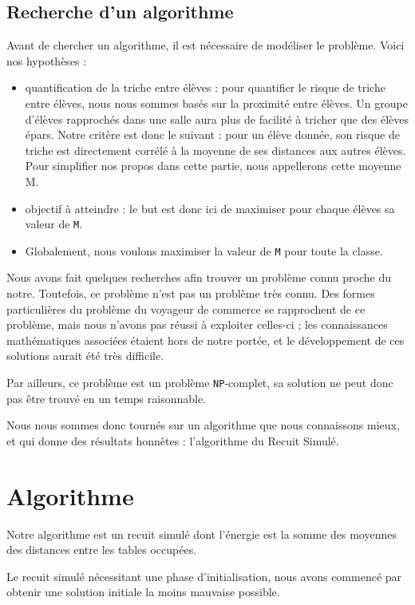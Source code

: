 \documentclass[11pt,a4paper, openany]{book}
\begin{document}
\section*{Recherche d'un algorithme}

Avant de chercher un algorithme, il est nécessaire de modéliser le problème.
Voici nos hypothèses : 
\begin{itemize}
\item quantification de la triche entre élèves : pour quantifier le risque de triche entre élèves, nous nous sommes basés sur la proximité entre élèves. Un groupe d'élèves rapprochés dans une salle aura plus de facilité à tricher que des élèves épars.
Notre critère est donc le suivant : pour un élève donnée, son risque de triche est directement corrélé à la moyenne de ses distances aux autres élèves.
Pour simplifier nos propos dans cette partie, nous appellerons cette moyenne M.
\item objectif à atteindre : le but est donc ici de maximiser pour chaque élèves sa valeur de \texttt{M}.
\item Globalement, nous voulons maximiser la valeur de \texttt{M} pour toute la classe.
\end{itemize}

Nous avons fait quelques recherches afin trouver un problème connu proche du notre.
Toutefois, ce problème n'est pas un problème très connu. Des formes particulières du problème du voyageur de commerce se rapprochent de ce problème, mais nous n'avons pas réussi à exploiter celles-ci ; les connaissances mathématiques associées étaient hors de notre portée, et le développement de ces solutions aurait été très difficile.

Par ailleurs, ce problème est un problème \texttt{NP}-complet, sa solution ne peut donc pas être trouvé en un temps raisonnable.

Nous nous sommes donc tournés sur un algorithme que nous connaissons mieux, et qui donne des résultats honnêtes : l'algorithme du Recuit Simulé.


\chapter{Algorithme}

Notre algorithme est un recuit simulé dont l'énergie est la somme des moyennes des distances entre les tables occupées.

Le recuit simulé nécessitant une phase d'initialisation, nous avons commencé par obtenir une solution initiale la moins mauvaise possible.
\end{document}
